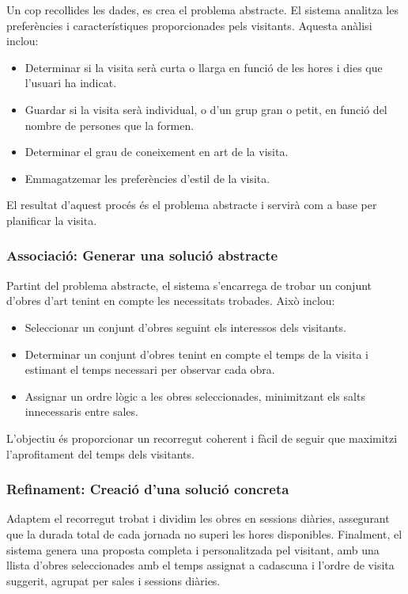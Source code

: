 \documentclass[a4paper]{article}
\begin{document}
	Un cop recollides les dades, es crea el problema abstracte. El sistema analitza les preferències i característiques proporcionades pels visitants. Aquesta anàlisi inclou:
	\begin{itemize}
		\item Determinar si la visita serà curta o llarga en funció de les hores i dies que l'usuari ha indicat.
		\item Guardar si la visita serà individual, o d'un grup gran o petit, en funció del nombre de persones que la formen.
		\item Determinar el grau de coneixement en art de la visita.
		\item Emmagatzemar les preferències d'estil de la visita.
	\end{itemize}
	
	El resultat d’aquest procés és el problema abstracte i servirà com a base per planificar la visita.
	
	
	\subsubsection{Associació: Generar una solució abstracte}

	Partint del problema abstracte, el sistema s’encarrega de trobar un conjunt d'obres d'art tenint en compte les necessitats trobades. Això inclou:
	\begin{itemize}
		\item Seleccionar un conjunt d'obres seguint els interessos dels visitants.
		\item Determinar un conjunt d'obres tenint en compte el temps de la visita i estimant el temps necessari per observar cada obra.
		\item Assignar un ordre lògic a les obres seleccionades, minimitzant els salts innecessaris entre sales.
	\end{itemize}
	
	L’objectiu és proporcionar un recorregut coherent i fàcil de seguir que maximitzi l’aprofitament del temps dels visitants.
	
	\subsubsection{Refinament: Creació d'una solució concreta}
	
	Adaptem el recorregut trobat i dividim les obres en sessions diàries, assegurant que la durada total de cada jornada no superi les hores disponibles.
	Finalment, el sistema genera una proposta completa i personalitzada pel visitant, amb una llista d'obres seleccionades amb el temps assignat a cadascuna i l’ordre de visita suggerit, agrupat per sales i sessions diàries.
\end{document}

